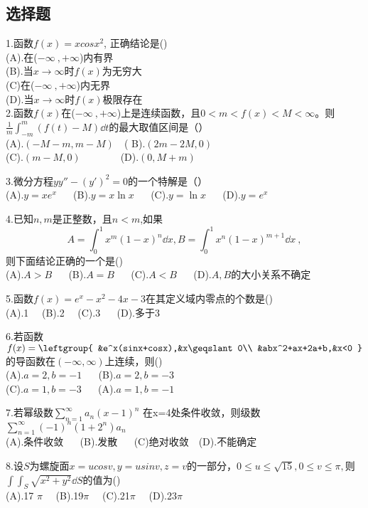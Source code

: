 



\subsection{选择题}
1.函数$f(x)=xcosx^2$, 正确结论是()\\
(A).在($-\infty~,+\infty$)内有界\\
(B).当$x\to\infty$时$f(x)$为无穷大\\
(C)在($-\infty~,+\infty$)内无界\\
(D).当$x\to\infty$时$f(x)$极限存在\\

2.函数$f(x)$在($-\infty~,+\infty$)上是连续函数，且$0<m<f(x)<M<\infty$。则
$ \frac{1}{m} \int_{-m}^{m}(f(t)-M )\dd{t}$的最大取值区间是（）\\
(A).$(-M-m,m-M) \quad$( B).$ (2m-2M,0)$\\ (C).$(m-M,0)\qquad \qquad $(D).$(0,M+m)$

3.微分方程$y y''-(y')^2=0$的一个特解是（）\\
(A).$y=xe^x$ $\quad$ (B).$y=x\ln x$ $\quad$ (C).$y=\ln x$  $\quad$ (D).$y=e^x$

4.已知$n,m$是正整数，且$n<m$,如果
\begin{equation}
A=\int_{0}^{1} x^m(1-x)^n \dd{x},B=\int_{0}^{1}x^n(1-x)^{m+1} \dd{x}~,
\end{equation}则下面结论正确的一个是()\\
(A).$A>B$ $\quad$ (B).$A=B$ $\quad$ (C).$A<B$ $\quad$ (D).$A,B$的大小关系不确定

5.函数$f(x)=e^x-x^2-4x-3$在其定义域内零点的个数是()\\
(A).1 $\quad$(B).2 $\quad$(C).3 $\quad$ (D).多于3

6.若函数$f(x)=\leftgroup{
    &e^x(sinx+cosx),&x\geqslant0\\
    &abx^2+ax+2a+b,&x<0
    }$
    的导函数在$(-\infty,\infty)$上连续，则()\\
    (A).$a=2,b=-1$   $\quad$  (B).$a=2,b=-3$   \\
    (C).$a=1,b=-3$   $\quad$   (A).$a=1,b=-1$   

7.若幂级数$\displaystyle \sum_{n=1}^\infty a_n(x-1)^n$ 
在x=4处条件收敛，则级数$\displaystyle \sum_{n=1}^\infty (-1)^n(1+2^n)a_n $\\
(A).条件收敛 $\quad$ (B).发散 $\quad$ (C)绝对收敛$\quad$(D).不能确定

8.设$S$为螺旋面$x=ucosv,y=usinv,z=v$的一部分，$0\leqslant u \leqslant \sqrt{15},0 \leqslant v \leqslant \pi,$则$\int \int_{S} \sqrt{x^2+y^2} \dd{S}$的值为()\\
(A).17 $\pi \quad$ (B).19$ \pi \quad$ (C).21$ \pi \quad$  (D).23$ \pi \quad$

